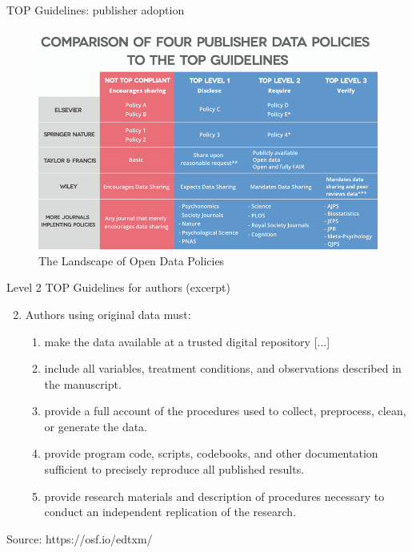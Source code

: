 \documentclass[aspectratio=169, 12pt]{beamer} %
\begin{document}
\begin{frame}{TOP Guidelines: publisher adoption}
  \begin{figure}[H]
    \centering
        \includegraphics[height=.7\textheight]{figures/TOP-landscape.png}
        \caption{The Landscape of Open Data Policies \cite{Mellor2018-bf}}
        \label{fig:figure1}
  \end{figure}
\end{frame}

\begin{frame}{Level 2 TOP Guidelines for authors (excerpt)}
    \renewcommand{\labelenumii}{\alph{enumii}}
    \begin{enumerate}
        \setcounter{enumi}{1}
        \item Authors using original data must:
            \begin{enumerate}
            \item make the data available at a trusted digital repository [...]
            \item include all variables, treatment conditions, and observations described in the manuscript.
            \item provide a full account of the procedures used to collect, preprocess, clean, or generate the data.
            \item provide program code, scripts, codebooks, and other documentation sufficient to precisely reproduce all published results.
            \item provide research materials and description of procedures necessary to conduct an independent replication of the research.
            \end{enumerate}
    \end{enumerate}
    Source: https://osf.io/edtxm/
\end{frame}
\end{document}

